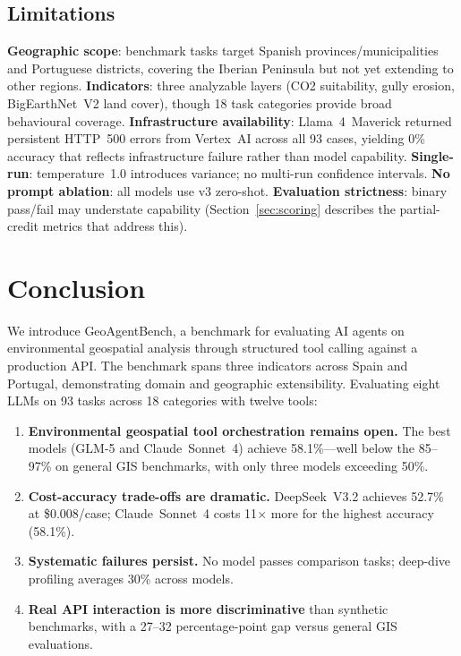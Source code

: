 \documentclass[10pt,twocolumn]{article}
\begin{document}
\subsection{Limitations}

\textbf{Geographic scope}: benchmark tasks target Spanish provinces/municipalities and Portuguese districts, covering the Iberian Peninsula but not yet extending to other regions. \textbf{Indicators}: three analyzable layers (CO2 suitability, gully erosion, BigEarthNet~V2 land cover), though 18 task categories provide broad behavioural coverage. \textbf{Infrastructure availability}: Llama~4~Maverick returned persistent HTTP~500 errors from Vertex~AI across all 93 cases, yielding 0\% accuracy that reflects infrastructure failure rather than model capability. \textbf{Single-run}: temperature~1.0 introduces variance; no multi-run confidence intervals. \textbf{No prompt ablation}: all models use v3 zero-shot. \textbf{Evaluation strictness}: binary pass/fail may understate capability (Section~\ref{sec:scoring} describes the partial-credit metrics that address this).


\section{Conclusion}
\label{sec:conclusion}

We introduce GeoAgentBench, a benchmark for evaluating AI agents on environmental geospatial analysis through structured tool calling against a production API. The benchmark spans three indicators across Spain and Portugal, demonstrating domain and geographic extensibility. Evaluating eight LLMs on 93 tasks across 18 categories with twelve tools:

\begin{enumerate}
  \item \textbf{Environmental geospatial tool orchestration remains open.} The best models (GLM-5 and Claude~Sonnet~4) achieve 58.1\%---well below the 85--97\% on general GIS benchmarks, with only three models exceeding 50\%.
  \item \textbf{Cost-accuracy trade-offs are dramatic.} DeepSeek~V3.2 achieves 52.7\% at \$0.008/case; Claude~Sonnet~4 costs 11$\times$ more for the highest accuracy (58.1\%).
  \item \textbf{Systematic failures persist.} No model passes comparison tasks; deep-dive profiling averages 30\% across models.
  \item \textbf{Real API interaction is more discriminative} than synthetic benchmarks, with a 27--32 percentage-point gap versus general GIS evaluations.
\end{enumerate}
\end{document}
